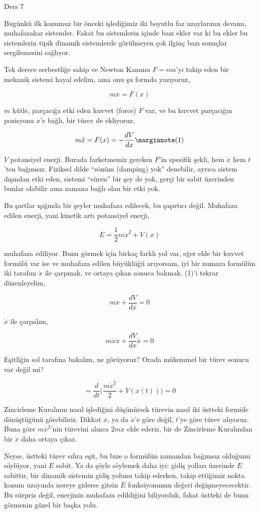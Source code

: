 \documentclass[12pt,fleqn]{article}\usepackage{../../common}
\begin{document}
Ders 7

Bugünkü ilk konumuz bir önceki işlediğimiz iki boyutlu faz uzaylarının devamı,
muhafazakar sistemler. Fakat bu sistemlerin içinde bazı ekler var ki bu ekler bu
sistemlerin tipik dinamik sistemlerde görülmeyen çok ilginç bazı sonuçlar
sergilemesini sağlıyor.

Tek derece serbestliğe sahip ve Newton Kanunu $F=ma$'yı takip eden bir mekanik
sistemi hayal edelim, ama onu şu formda yazıyoruz,

$$ m\ddot{x} = F(x) $$

$m$ kütle, parçacığa etki eden kuvvet (force) $F$ var, ve bu kuvvet parçacığın
pozisyonu $x$'e bağlı, bir türev de ekliyoruz,

$$ m\ddot{x} = F(x) = -\frac{dV}{dx} 
\mlabel{1}$$

$V$ potansiyel enerji. Burada farketmemiz gereken $F$'in spesifik şekli, hem
$\dot{x}$ hem $t$'ten bağımsız. Fiziksel dilde ``sönüm (damping) yok''
denebilir, ayrıca sistem dışından etki eden, sistemi ``süren'' bir şey de yok,
gerçi bir sabit üzerinden bunlar olabilir ama zamana bağlı olan bir etki yok.

Bu şartlar ışığında bir şeyler muhafaza edilecek, bu şaşırtıcı değil. Muhafaza
edilen enerji, yani kinetik artı potansiyel enerji,

$$ E = \frac{1}{2} m\dot{x}^2 + V(x) $$

muhafaza ediliyor. Bunu görmek için birkaç farklı yol var, eğer elde bir kuvvet
formülü var ise ve muhafaza edilen büyüklüğü arıyorsam, iyi bir numara formülün
iki tarafını $\dot{x}$ ile çarpmak, ve ortaya çıkan sonuca bakmak. (1)'i tekrar
düzenleyelim,

$$ m\ddot{x} + \frac{dV}{dx} = 0$$

$\dot{x}$ ile çarpalım,

$$ m\ddot{x}\dot{x} + \frac{dV}{dx}\dot{x} = 0 $$

Eşitliğin sol tarafına bakalım, ne görüyoruz? Orada mükemmel bir türev sonucu
var değil mi?

$$ = \frac{d}{dt} \big( \frac{m\dot{x}^2}{2} + V(x(t)) \big) = 0$$

Zincirleme Kuralının nasıl işlediğini düşünürsek türevin nasıl iki üstteki formüle
dönüştüğünü görebiliriz. Dikkat $x$, ya da $\dot{x}$'e göre değil, $t$'ye göre
türev alıyoruz. Buna göre $m\dot{x}^2$'nin türevini alınca $2m\dot{x}$ elde
ederiz, bir de Zincirleme Kuralından bir $\dot{x}$ daha ortaya çıkar. 

Neyse, üstteki türev sıfıra eşit, bu bize o formülün zamandan bağımsız olduğunu
söylüyor, yani $E$ sabit. Ya da şöyle söylemek daha iyi: gidiş yolları üzerinde
$E$ sabittir, bir dinamik sistemin gidiş yolunu takip ederken, takip ettiğimiz
nokta konum uzayında nereye giderse gitsin $E$ fonksiyonunun değeri
değişmeyececektir. Bu sürpriz değil, enerjinin muhafaza edildiğini
biliyorduk, fakat üstteki de bunu görmenin güzel bir başka yolu.
\end{document}
